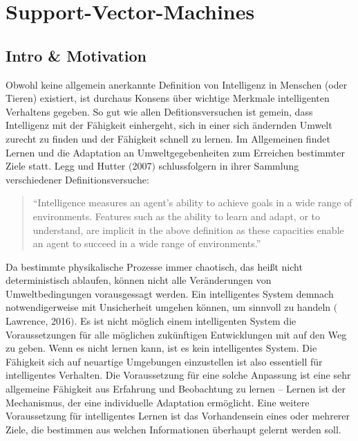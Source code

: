 \chapter{Support-Vector-Machines}
\usetikzlibrary{calc}
\usetikzlibrary{positioning}
\usetikzlibrary{matrix}

\section{Intro \& Motivation}
Obwohl keine allgemein anerkannte Definition von Intelligenz in Menschen (oder
Tieren) existiert, ist durchaus Konsens über wichtige Merkmale intelligenten
Verhaltens gegeben. So gut wie allen Defitionsversuchen ist gemein, dass Intelligenz
mit der Fähigkeit einhergeht, sich in einer sich ändernden Umwelt zurecht zu finden
und der Fähigkeit schnell zu lernen. Im Allgemeinen findet Lernen und die Adaptation
an Umweltgegebenheiten zum Erreichen bestimmter Ziele statt. Legg und Hutter
$($2007$)$ schlussfolgern in ihrer Sammlung verschiedener Definitionsversuche:

\begin{quote}
``Intelligence measures an agent’s ability to achieve goals in a wide range of
  environments. Features such as the ability to learn and adapt, or to understand,
  are implicit in the above definition as these capacities enable an agent to succeed
  in a wide range of environments.''
\end{quote}

Da bestimmte physikalische Prozesse immer chaotisch, das heißt nicht deterministisch
ablaufen, können nicht alle Veränderungen von Umweltbedingungen vorausgessagt
werden. Ein intelligentes System demnach notwendigerweise mit Unsicherheit umgehen
können, um sinnvoll zu handeln $($Lawrence, 2016$)$. Es ist nicht möglich einem
intelligenten System die Voraussetzungen für alle möglichen zukünftigen Entwicklungen
mit auf den Weg zu geben. Wenn es nicht lernen kann, ist es kein intelligentes
System.  Die Fähigkeit sich auf neuartige Umgebungen einzustellen ist also essentiell
für intelligentes Verhalten. Die Voraussetzung für eine solche Anpassung ist eine
sehr allgemeine Fähigkeit aus Erfahrung und Beobachtung zu lernen -- Lernen ist der
Mechanismus, der eine individuelle Adaptation ermöglicht. Eine weitere Voraussetzung
für intelligentes Lernen ist das Vorhandensein eines oder mehrerer Ziele, die
bestimmen aus welchen Informationen überhaupt gelernt werden soll.

